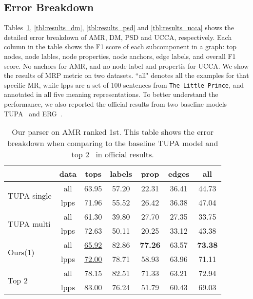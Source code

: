 \subsection{Error Breakdown}
\label{ssec:error_breakdown}
Tables~\ref{tbl:results_amr}, \ref{tbl:results_dm},
\ref{tbl:results_psd} and \ref{tbl:results_ucca} shows the detailed
error breakdown of AMR, DM, PSD and UCCA, respectively. Each column in
the table shows the F1 score of each subcomponent in a graph: top
nodes, node lables, node properties, node anchors, edge labels, and
overall F1 score. No anchors for AMR, and no node label and propertis
for UCCA. We show the results of MRP metric on two datasets. ``all"
denotes all the examples for that specific MR, while lpps are a set of
100 sentences from \texttt{The Little Prince}, and annotated in all five
meaning representations. To better understand the performance, we also
reported the official results from two baseline models
TUPA~\cite{Her:Arv:19} and ERG~\cite{Oep:Fli:19}.

\begin{table}[!tbp]
\caption{\label{tbl:results_amr} Our parser on AMR ranked 1st. This table shows the error breakdown when comparing to the baseline TUPA model and top 2~\cite{Che:Dou:Xu:19} in official results.}
\begin{center}
\setlength{\tabcolsep}{3pt}
\begin{tabular}{lcccccc}
\toprule
                          & data & tops              & labels & prop  & edges & all   \\ \hline
\multirow{2}{*}{ \parbox{1cm}{TUPA
single} }                 & all  & 63.95             & 57.20  & 22.31 & 36.41 & 44.73 \\
                          & lpps & 71.96             & 55.52  & 26.42 & 36.38 & 47.04 \\ \hline
\multirow{2}{*}{ \parbox{1cm}{TUPA
multi} }                  & all  & 61.30             & 39.80  & 27.70 & 27.35 & 33.75 \\
                          & lpps & 72.63             & 50.11  & 20.25 & 33.12 & 43.38 \\ \hline
\multirow{2}{*}{ Ours(1)} & all  & \underline{65.92} & 82.86  & {\bf 77.26} & 63.57 & {\bf 73.38} \\
                          & lpps & \underline{72.00} & 78.71  & 58.93 & 63.96 & 71.11 \\ \hline
\multirow{2}{*}{ Top 2}  & all  & 78.15             & 82.51  & 71.33 & 63.21 & 72.94 \\
                          & lpps & 83.00             & 76.24  & 51.79 & 60.43 & 69.03 \\ \bottomrule
\end{tabular}
\end{center}
\end{table}

